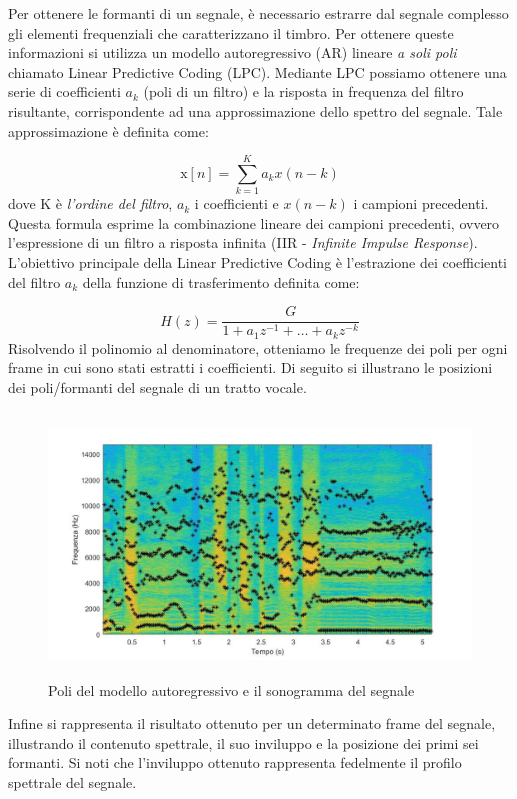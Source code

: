 \documentclass[12pt]{report}
\begin{document}
Per ottenere le formanti di un segnale, è necessario estrarre dal segnale complesso gli elementi frequenziali che caratterizzano il timbro. Per ottenere queste informazioni si utilizza un modello autoregressivo (AR) lineare {\itshape a soli poli} chiamato Linear Predictive Coding (LPC). Mediante LPC possiamo ottenere una serie di coefficienti $a_k$ (poli di un filtro) e la risposta in frequenza del filtro risultante, corrispondente ad una approssimazione dello spettro del segnale. Tale approssimazione è definita come:

$$  \mbox{\^{x}}[n] = \sum_{k = 1}^{K}a_k x(n-k) $$
dove K è {\itshape l'ordine del filtro}, $a_k$ i coefficienti e $x(n-k)$ i campioni precedenti. Questa formula esprime la combinazione lineare dei campioni precedenti, ovvero l'espressione di un filtro a risposta infinita (IIR - {\itshape Infinite Impulse Response}). \\
L'obiettivo principale della Linear Predictive Coding è l'estrazione dei coefficienti del filtro $a_k$ della funzione di trasferimento definita come:

$$ H(z) = \frac{G}{1 + a_1z^{-1} +\dots+ a_kz^{-k} } $$
Risolvendo il polinomio al denominatore, otteniamo le frequenze dei poli per ogni frame in cui sono stati estratti i coefficienti. Di seguito si illustrano le posizioni dei poli/formanti del segnale di un tratto vocale.

\begin{figure}[htbp]
\centerline{\includegraphics[height=70mm]{img/formant_sono}}
\caption{Poli del modello autoregressivo e il sonogramma del segnale}
\label{fig:formant_sono}
\end{figure}

Infine si rappresenta il risultato ottenuto per un determinato frame del segnale, illustrando il contenuto spettrale, il suo inviluppo e la posizione dei primi sei formanti. Si noti che l'inviluppo ottenuto rappresenta fedelmente il profilo spettrale del segnale.
\end{document}
